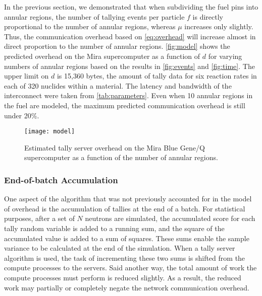 \documentclass{snamc2013}
\begin{document}
In the previous section, we demonstrated that when subdividing the fuel pins
into annular regions, the number of tallying events per particle $f$ is directly
proportional to the number of annular regions, whereas $\mu$ increases only
slightly. Thus, the communication overhead based on \eqref{eq:overhead} will
increase almost in direct proportion to the number of annular
regions. \autoref{fig:model} shows the predicted overhead on the Mira
supercomputer as a function of $d$ for varying numbers of annular regions based
on the results in \autoref{fig:events} and \autoref{fig:time}. The upper limit
on $d$ is 15,360 bytes, the amount of tally data for six reaction rates in each
of 320 nuclides within a material. The latency and bandwidth of the interconnect
were taken from \autoref{tab:parameters}. Even when 10 annular regions in the
fuel are modeled, the maximum predicted communication overhead is still under
20\%.
\begin{figure}[htb]
  \centering
  \texttt{[image: model]}
  \caption{Estimated tally server overhead on the Mira Blue Gene/Q supercomputer
    as a function of the number of annular regions.}
  \label{fig:model}
\end{figure}

\subsubsection{End-of-batch Accumulation}
\label{sec:end-of-batch}

One aspect of the algorithm that was not previously accounted for in the model
of overhead is the accumulation of tallies at the end of a batch. For
statistical purposes, after a set of $N$ neutrons are simulated, the accumulated
score for each tally random variable is added to a running sum, and the square
of the accumulated value is added to a sum of squares. These sums enable the
sample variance to be calculated at the end of the simulation. When a tally
server algorithm is used, the task of incrementing these two sums is shifted
from the compute processes to the servers. Said another way, the total amount
of work the compute processes must perform is reduced slightly. As a result, the
reduced work may partially or completely negate the network communication
overhead.
\end{document}
